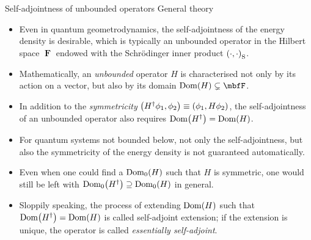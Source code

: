 \documentclass[8pt]{beamer}
\begin{document}
\begin{frame}%
{Self-adjointness of unbounded operators}%
{General theory}
\begin{itemize}
\item Even in quantum geometrodynamics, the self-adjointness of the energy
density is desirable,
which is typically an unbounded operator in the Hilbert space $\mbfF$ endowed
with the Schr\"odinger inner product ${\left(\cdot,\cdot\right)}_\text{S}$.

\item Mathematically, an \emph{unbounded} operator
$H$ is characterised not only by its action on a vector, but also by its domain
$\rfun{\mathrm{Dom}}{H} \subsetneq \mbfF$.

\item In addition to the \emph{symmetricity} ${\left(H^\dagger \phi_1, \phi_2\right)}
\equiv {\left(\phi_1, H \phi_2\right)}$, the self-adjointness of an unbounded operator
also requires ${\mathrm{Dom}}\mathopen{}\left(H^\dagger\right)\mathclose{} = {\mathrm{Dom}}\mathopen{}\left(H\right)\mathclose{}$.

\item For quantum systems not bounded below, not only the self-adjointness, but
also the symmetricity of the energy density is not guaranteed automatically.

\item Even when one could find a ${\mathrm{Dom}_0}\mathopen{}\left(H\right)\mathclose{}$ such that $H$ is
symmetric, one would still be left with ${\mathrm{Dom}_0}\mathopen{}\left(H^\dagger\right)\mathclose{}
\supseteq {\mathrm{Dom}_0}\mathopen{}\left(H\right)\mathclose{}$ in general.

\item Sloppily speaking, the process of extending ${\mathrm{Dom}}\mathopen{}\left(H\right)\mathclose{}$ such
that ${\mathrm{Dom}}\mathopen{}\left(H^\dagger\right)\mathclose{} = {\mathrm{Dom}}\mathopen{}\left(H\right)\mathclose{}$ is called
\alert{self-adjoint extension}; if the extension is unique, the operator is called
\emph{essentially self-adjoint}.

\end{itemize}
\end{frame}


\end{document}
